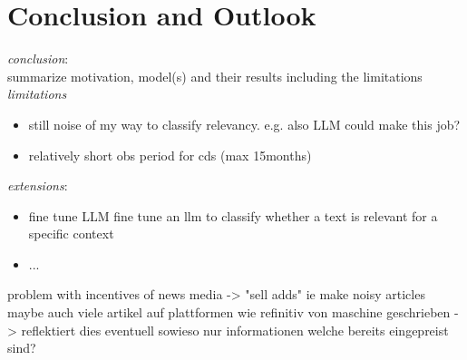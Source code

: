 \chapter{Conclusion and Outlook}\label{sec6}
\thispagestyle{empty}

\textit{conclusion}: \\
summarize motivation, model(s) and their results including the limitations \\

\noindent
\textit{limitations}
\begin{itemize}
	\item still noise of my way to classify relevancy. e.g. also LLM could make this job?
	\item relatively short obs period for cds (max 15months)
\end{itemize}

\noindent
\textit{extensions}:
\begin{itemize}
	\item fine tune LLM fine tune an llm to classify whether a text is relevant for a specific context
	\item ...
\end{itemize}

problem with incentives of news media -> "sell adds" ie make noisy articles \\

maybe auch viele artikel auf plattformen wie refinitiv von maschine geschrieben -> reflektiert dies eventuell sowieso nur informationen welche bereits eingepreist sind?




\cleardoublepage
